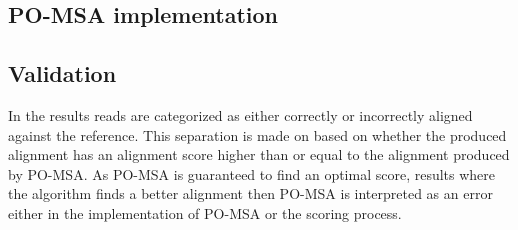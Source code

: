 \documentclass[thesis.tex]{subfiles}
\begin{document}
\subsection{PO-MSA implementation}
\subsection{Validation}
In the results reads are categorized as either correctly or incorrectly aligned against the reference. This separation is made on based on whether the produced alignment has an alignment score higher than or equal to the alignment produced by PO-MSA. As PO-MSA is guaranteed to find an optimal score, results where the algorithm finds a better alignment then PO-MSA is interpreted as an error either in the implementation of PO-MSA or the scoring process. 
\end{document}
